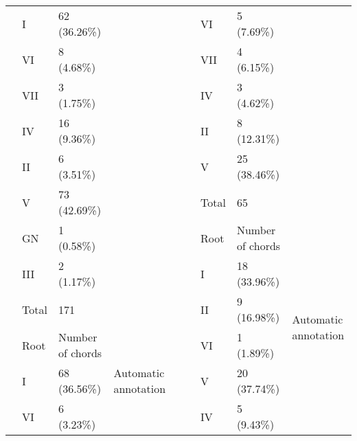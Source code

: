 \begin{table}[]
{\begin{tabular}{|l|l|l|l|lllll}
 & I & 62 (36.26\%) &  & \multicolumn{1}{l|}{} & \multicolumn{1}{l|}{} & \multicolumn{1}{l|}{VI} & \multicolumn{1}{l|}{5 (7.69\%)} & \multicolumn{1}{l|}{} \\ \cline{2-3} \cline{7-8}
 & VI & 8 (4.68\%) &  & \multicolumn{1}{l|}{} & \multicolumn{1}{l|}{} & \multicolumn{1}{l|}{VII} & \multicolumn{1}{l|}{4 (6.15\%)} & \multicolumn{1}{l|}{} \\ \cline{2-3} \cline{7-8}
 & VII & 3 (1.75\%) &  & \multicolumn{1}{l|}{} & \multicolumn{1}{l|}{} & \multicolumn{1}{l|}{IV} & \multicolumn{1}{l|}{3 (4.62\%)} & \multicolumn{1}{l|}{} \\ \cline{2-3} \cline{7-8}
 & IV & 16 (9.36\%) &  & \multicolumn{1}{l|}{} & \multicolumn{1}{l|}{} & \multicolumn{1}{l|}{II} & \multicolumn{1}{l|}{8 (12.31\%)} & \multicolumn{1}{l|}{} \\ \cline{2-3} \cline{7-8}
 & II & 6 (3.51\%) &  & \multicolumn{1}{l|}{} & \multicolumn{1}{l|}{} & \multicolumn{1}{l|}{V} & \multicolumn{1}{l|}{25 (38.46\%)} & \multicolumn{1}{l|}{} \\ \cline{2-3} \cline{7-8}
 & V & 73 (42.69\%) &  & \multicolumn{1}{l|}{} & \multicolumn{1}{l|}{} & \multicolumn{1}{l|}{Total} & \multicolumn{1}{l|}{65} & \multicolumn{1}{l|}{} \\ \cline{2-3} \cline{7-9}
 & GN & 1 (0.58\%) &  & \multicolumn{1}{l|}{} & \multicolumn{1}{l|}{} & \multicolumn{1}{l|}{Root} & \multicolumn{1}{l|}{Number of chords} & \multicolumn{1}{l|}{\multirow{7}{*}{Automatic annotation}} \\ \cline{2-3} \cline{7-8}
 & III & 2 (1.17\%) &  & \multicolumn{1}{l|}{} & \multicolumn{1}{l|}{} & \multicolumn{1}{l|}{I} & \multicolumn{1}{l|}{18 (33.96\%)} & \multicolumn{1}{l|}{} \\ \cline{2-3} \cline{7-8}
 & Total & 171 &  & \multicolumn{1}{l|}{} & \multicolumn{1}{l|}{} & \multicolumn{1}{l|}{II} & \multicolumn{1}{l|}{9 (16.98\%)} & \multicolumn{1}{l|}{} \\ \cline{2-4} \cline{7-8}
 & Root & Number of chords & \multirow{8}{*}{Automatic annotation} & \multicolumn{1}{l|}{} & \multicolumn{1}{l|}{} & \multicolumn{1}{l|}{VI} & \multicolumn{1}{l|}{1 (1.89\%)} & \multicolumn{1}{l|}{} \\ \cline{2-3} \cline{7-8}
 & I & 68 (36.56\%) &  & \multicolumn{1}{l|}{} & \multicolumn{1}{l|}{} & \multicolumn{1}{l|}{V} & \multicolumn{1}{l|}{20 (37.74\%)} & \multicolumn{1}{l|}{} \\ \cline{2-3} \cline{7-8}
 & VI & 6 (3.23\%) &  & \multicolumn{1}{l|}{} & \multicolumn{1}{l|}{} & \multicolumn{1}{l|}{IV} & \multicolumn{1}{l|}{5 (9.43\%)} & \multicolumn{1}{l|}{} \\ \cline{2-3} \cline{7-8}

\end{tabular}}
\end{table}
